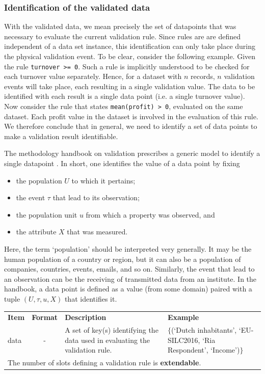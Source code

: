 \documentclass[a4paper, 11pt,titlepage]{article}
\newcommand{\code}[1]{\texttt{#1}}
\begin{document}
\subsubsection{Identification of the validated data}
\label{sect:iddata}
With the validated data, we mean precisely the set of datapoints that was
necessary to evaluate the current validation rule. Since rules are are defined
independent of a data set instance, this identification can only take place
during the physical validation event. To be clear, consider the following
example. Given the rule \code{turnover >= 0}. Such a rule is implicitly
understood to be checked for each turnover value separately. Hence, for a
dataset with $n$ records, $n$ validation events will take place, each resulting
in a single validation value. The data to be identified with each result is a
single data point (i.e. a single turnover value). Now consider the rule that
states \code{mean(profit) > 0}, evaluated on the same dataset. Each profit
value in the dataset is involved in the evaluation of this rule. We therefore
conclude that in general, we need to identify a set of data points to make a
validation result identifiable.


The methodology handbook on validation prescribes a generic model to 
identify a single datapoint \citep[Chapter~5]{zio2015methodology}. In short,
one identifies the value of a data point by fixing
\begin{itemize}
\item the population $U$ to which it pertains;
\item the event $\tau$ that lead to its observation;
\item the population unit $u$ from which a property was observed, and
\item the attribute $X$ that was measured.
\end{itemize}
Here, the term `population' should be interpreted very generally. It may be the
human population of a country or region, but it can also be a population of
companies, countries, events, emails, and so on. Similarly, the event that lead
to an observation can be the receiving of transmitted data from an institute.
In the handbook, a data point is defined as a value (from some domain) paired
with a tuple $(U,\tau,u,X)$ that identifies it.




\begin{center}
\begin{tabular}{|lp{15mm}p{}p{}|}
\hline
\textbf{Item} & \textbf{Format} & \textbf{Description} &\textbf{Example}\\
data    &\multicolumn{1}{c}{-} & A set of key(s) 
identifying the data used in evaluating the validation rule.
&  $\{$(`Dutch inhabitants', `EU-SILC2016, `Ria Respondent', `Income')$\}$\\
\hline
\multicolumn{4}{|l|}{The number of slots defining a validation rule is \textbf{extendable}.
}\\
\hline
\end{tabular}
\end{center}
\end{document}

